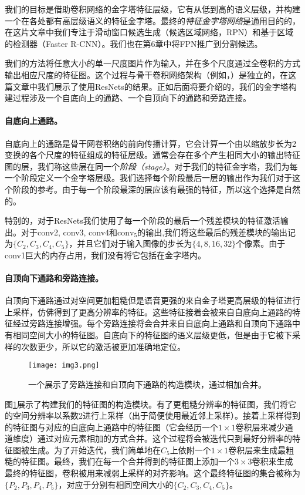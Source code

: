 \documentclass[../main.tex]{subfile}
\begin{document}
我们的目标是借助卷积网络的金字塔特征层级，它有从低到高的语义层级，并构建一个在各处都有高层级语义的特征金字塔。最终的\textit{特征金字塔网络}是通用目的的，在这片文章中我们专注于滑动窗口候选生成（候选区域网络，RPN）和基于区域的检测器（Faster R-CNN）。我们也在第6章中将FPN推广到分割候选。

我们的方法将任意大小的单一尺度图片作为输入，并在多个尺度通过全卷积的方式输出相应尺度的特征图。这个过程与骨干卷积网络架构（例如，\cite{alexnet,vgg,resnet}）是独立的，在这篇文章中我们展示了使用ResNets\cite{resnet}的结果。正如后面将要介绍的，我们的金字塔构建过程涉及一个自底向上的通路、一个自顶向下的通路和旁路连接。

\paragraph{自底向上通路。}自底向上的通路是骨干网卷积络的前向传播计算，它会计算一个由以缩放步长为2变换的各个尺度的特征组成的特征层级。通常会存在多个产生相同大小的输出特征图的层，我们称这些层在同一个\textit{阶段（stage）}。对于我们的特征金字塔，我们为每一个阶段定义一个金字塔层级。我们选择每个阶段最后一层的输出作为我们对于这个阶段的参考。由于每一个阶段最深的层应该有最强的特征，所以这个选择是自然的。

特别的，对于ResNets\cite{resnet}我们使用了每一个阶段的最后一个残差模块的特征激活输出。对于conv2, conv3, conv4和$\text{conv}_5$的输出,我们将这些最后的残差模块的输出记为$\{C_2, C_3,C_4,C_5\}$，并且它们对于输入图像的步长为$\{4, 8, 16, 32\}$个像素。由于conv1巨大的内存占用，我们没有将它包括在金字塔内。

\paragraph{自顶向下通路和旁路连接。}自顶向下通路通过对空间更加粗糙但是语音更强的来自金子塔更高层级的特征进行上采样，仿佛得到了更高分辨率的特征。这些特征接着会被来自自底向上通路的特征经过旁路连接增强。每个旁路连接将会合并来自自底向上通路和自顶向下通路中有相同空间大小的特征图。自底向下的特征图的语义层级更低，但是由于它被下采样的次数更少，所以它的激活被更加准确地定位。

\begin{figure}[htb]
    \centering
    \texttt{[image: img3.png]}
    \caption{一个展示了旁路连接和自顶向下通路的构造模块，通过相加合并。}
    \label{fig:img3}
\end{figure}

图\ref{fig:img3}展示了构建我们的特征图的构造模块。有了更粗糙分辨率的特征图，我们将它的空间分辨率以系数2进行上采样（出于简便使用最近邻上采样）。接着上采样得到的特征图与对应的自底向上通路中的特征图（它会经历一个$1\times 1$卷积层来减少通道维度）通过对应元素相加的方式合并。这个过程将会被迭代只到最好分辨率的特征图被生成。为了开始迭代，我们简单地在$C_5$上依附一个$1\times 1$卷积层来生成最粗糙的特征图。最终，我们在每一个合并得到的特征图上添加一个$3\times 3$卷积来生成最终的特征图，卷积被用来减弱上采样的对齐影响。这个最终特征图的集合被称为$\{P_2,P_3,P_4,P_5\}$，对应于分别有相同空间大小的$\{C_2,C_3,C_4, C_5\}$。
\end{document}
